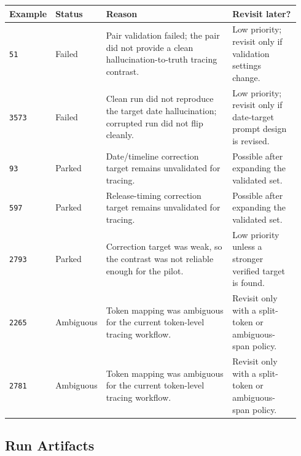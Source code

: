\documentclass[11pt]{article}
\begin{document}
\begin{center}
\label{tab:excluded}
\footnotesize
\setlength{\tabcolsep}{4pt}
\renewcommand{\arraystretch}{1.0}
\begin{tabular}{@{}p{0.08\linewidth}p{0.11\linewidth}p{0.50\linewidth}p{0.25\linewidth}@{}}
\toprule
\textbf{Example} & \textbf{Status} & \textbf{Reason} & \textbf{Revisit later?} \\
\midrule
\texttt{51} & Failed & Pair validation failed; the pair did not provide a clean hallucination-to-truth tracing contrast. & Low priority; revisit only if validation settings change. \\
\texttt{3573} & Failed & Clean run did not reproduce the target date hallucination; corrupted run did not flip cleanly. & Low priority; revisit only if date-target prompt design is revised. \\
\texttt{93} & Parked & Date/timeline correction target remains unvalidated for tracing. & Possible after expanding the validated set. \\
\texttt{597} & Parked & Release-timing correction target remains unvalidated for tracing. & Possible after expanding the validated set. \\
\texttt{2793} & Parked & Correction target was weak, so the contrast was not reliable enough for the pilot. & Low priority unless a stronger verified target is found. \\
\texttt{2265} & Ambiguous & Token mapping was ambiguous for the current token-level tracing workflow. & Revisit only with a split-token or ambiguous-span policy. \\
\texttt{2781} & Ambiguous & Token mapping was ambiguous for the current token-level tracing workflow. & Revisit only with a split-token or ambiguous-span policy. \\
\bottomrule
\end{tabular}
\end{center}
\vspace{-0.8em}

\subsection{Run Artifacts}
\label{app:artifacts}
\end{document}
